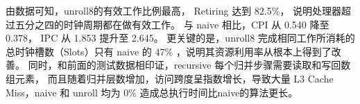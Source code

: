 \documentclass[a4paper]{article}
\begin{document}
由数据可知，unroll8的有效工作比例最高， Retiring 达到 82.5\%，
说明处理器超过五分之四的时钟周期都在做有效工作。
与 naive 相比，CPI 从 0.540 降至 0.378，
IPC 从 1.853 提升至 2.645。
更关键的是，unroll8 完成相同工作所消耗的总时钟槽数（Slots）只有 naive 的 47\%
，说明其资源利用率从根本上得到了改善。
同时，和前面的测试数据相印证，recursive 每个归并步骤需要读取和写回数组元素，
而且随着归并层数增加，访问跨度呈指数增长，导致大量 L3 Cache Miss，naive 和 unroll 均为 0\%
造成总执行时间比naive的算法更长。

\newpage

 
\end{document}
